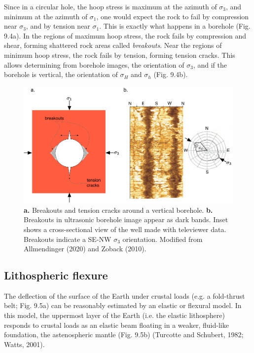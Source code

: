 \documentclass[a4paper , 12pt]{book}
\begin{document}
Since in a circular hole, the hoop stress is maximum at the azimuth of $\sigma_3$, and minimum at the azimuth of $\sigma_1$, one would expect the rock to fail by compression near $\sigma_3$, and by tension near $\sigma_1$. This is exactly what happens in a borehole (Fig. 9.4a). In the regions of maximum hoop stress, the rock fails by compression and shear, forming shattered rock areas called \textit{breakouts}. Near the regions of minimum hoop stress, the rock fails by tension, forming tension cracks. This allows determining from borehole images, the orientation of $\sigma_3$, and if the borehole is vertical, the orientation of $\sigma_H$ and $\sigma_h$ (Fig. 9.4b).

\begin{figure}[ht]
    \centering
    \includegraphics[width=14cm]{ch9f5.pdf}
    \caption{\textbf{a.} Breakouts and tension cracks around a vertical borehole. \textbf{b.} Breakouts in ultrasonic borehole image appear as dark bands. Inset shows a cross-sectional view of the well made with televiewer data. Breakouts indicate a SE-NW $\sigma_3$ orientation. Modified from Allmendinger (2020) and Zoback (2010).}
\end{figure}

\subsection{Lithospheric flexure}\label{lithflex}

The deflection of the surface of the Earth under crustal loads (e.g. a fold-thrust belt; Fig. 9.5a) can be reasonably estimated by an elastic or flexural model. In this model, the uppermost layer of the Earth (i.e. the elastic lithosphere) responds to crustal loads as an elastic beam floating in a weaker, fluid-like foundation, the astenospheric mantle (Fig. 9.5b) (Turcotte and Schubert, 1982; Watts, 2001).
\end{document}

